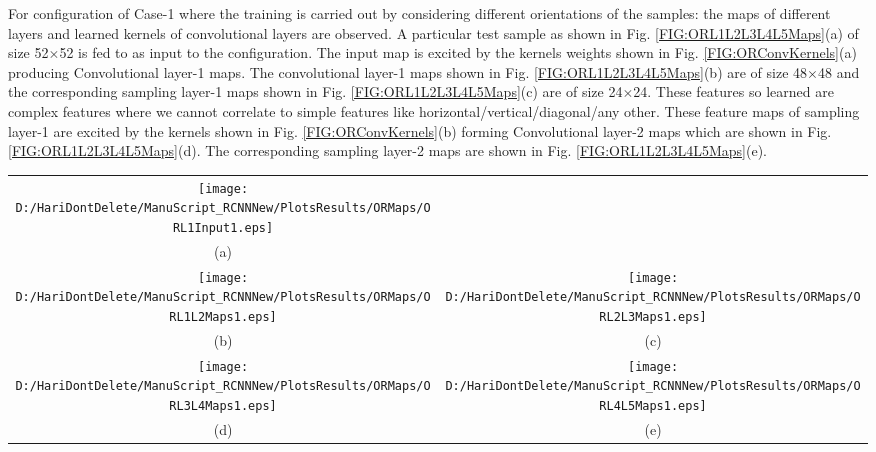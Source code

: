 For configuration of Case-1 where the training is carried out by considering different orientations of the samples: the maps of different layers and learned kernels of convolutional layers are observed. A particular test sample as shown in Fig. \ref{FIG:ORL1L2L3L4L5Maps}(a) of size 52$\times$52 is fed to as input to the configuration. The input map is excited by the kernels weights shown in Fig. \ref{FIG:ORConvKernels}(a) producing Convolutional layer-1 maps. The convolutional layer-1 maps shown in Fig. \ref{FIG:ORL1L2L3L4L5Maps}(b) are of size 48$\times$48 and the corresponding sampling layer-1 maps shown in Fig. \ref{FIG:ORL1L2L3L4L5Maps}(c) are of size 24$ \times$24. These features so learned are complex features where we cannot correlate to simple features like horizontal/vertical/diagonal/any other. These feature maps of sampling layer-1 are excited by the kernels shown in Fig. \ref{FIG:ORConvKernels}(b) forming Convolutional layer-2 maps which are shown in Fig. \ref{FIG:ORL1L2L3L4L5Maps}(d). The corresponding sampling layer-2 maps are shown in Fig. \ref{FIG:ORL1L2L3L4L5Maps}(e).\\


\begin{figure*}
\begin{tabular}{cc}
\texttt{[image: D:/HariDontDelete/ManuScript\_RCNNNew/PlotsResults/ORMaps/ORL1Input1.eps]}\\
(a)\\
\texttt{[image: D:/HariDontDelete/ManuScript\_RCNNNew/PlotsResults/ORMaps/ORL1L2Maps1.eps]}&\texttt{[image: D:/HariDontDelete/ManuScript\_RCNNNew/PlotsResults/ORMaps/ORL2L3Maps1.eps]}\\
(b)  & (c) \\
\texttt{[image: D:/HariDontDelete/ManuScript\_RCNNNew/PlotsResults/ORMaps/ORL3L4Maps1.eps]}&\texttt{[image: D:/HariDontDelete/ManuScript\_RCNNNew/PlotsResults/ORMaps/ORL4L5Maps1.eps]}\\
(d)  & (e) \\

\end{tabular}
\caption{ Maps at different layers of the original ideal configuration to have rotational invariancy i.e, Case-1 (training considering orientation of the samples); (a) Particular Input Map : Layer-1 Map, (b) Layer-2 Maps : Convolutional layer-1 maps, (c) Layer-3 Maps : Sampling layer-1 maps, (d) Layer-4 Maps : Convolutional layer-2 maps, (e) Layer-5 Maps : Sampling layer-2 maps}
\label{FIG:ORL1L2L3L4L5Maps}
\end{figure*}


